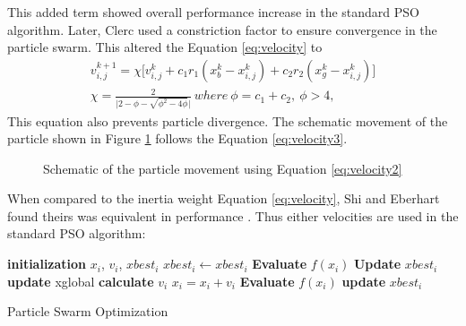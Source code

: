 This added term showed overall performance increase in the standard PSO algorithm. Later, Clerc \cite{} used a constriction factor to ensure convergence in the particle swarm. This altered the Equation \ref{eq:velocity} to 
\begin{align}
    \label{eq:velocity3}
    v^{k+1}_{i,j} = \chi \big[ v^{k}_{i,j} + c_1r_1(x^{k}_b - x^{k}_{i,j}) + c_2r_2(x^{k}_g - x^{k}_{i,j}) \big] \\
    \chi = \frac{2}{\big| 2- \phi - \sqrt{\phi^2 - 4\phi}\big|}\ where\ \phi = c_1 + c_2,\ \phi>4, \nonumber
\end{align}
This equation also prevents particle divergence. The schematic movement of the particle shown in Figure \ref{fig:particle movement} follows the Equation \ref{eq:velocity3}.

\begin{figure}[!h]
    \centering
    
    \caption{Schematic of the particle movement using Equation \ref{eq:velocity2}}
    \label{fig:particle movement}
\end{figure}

When compared to the inertia weight Equation \ref{eq:velocity}, Shi and Eberhart found theirs was equivalent in performance \cite{}. 
Thus either velocities are used in the standard PSO algorithm: 
\begin{algorithm}[H]
  \begin{algorithmic}[1]

        \State \textbf{initialization} $x_i$, $v_i$, $xbest_i$ 
        $xbest_i \gets xbest_i$
        \State \textbf{Evaluate} $f(x_i)$  
        \State \textbf{Update} $xbest_i$ 
    \EndFor
            \State \textbf{update} xglobal 
            \State \textbf{calculate} $v_i$ 
            \State $x_i = x_i + v_i$
            \State \textbf{Evaluate} $f(x_i)$
            \State \textbf{update} $xbest_i$
        \EndFor
    \EndWhile
  \end{algorithmic}
\caption{Particle Swarm Optimization}
\label{algorithmPSO}
\end{algorithm}

